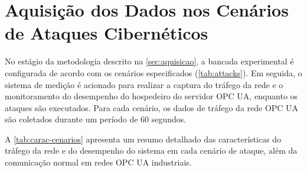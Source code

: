 \section{Aquisição dos Dados nos Cenários de Ataques Cibernéticos} \label{sec:exec-attacks}

    No estágio da metodologia descrito na \autoref{sec:aquisicao}, a bancada experimental é configurada de acordo com os cenários especificados (\autoref{tab:attacks}). Em seguida, o sistema de medição é acionado para realizar a captura do tráfego da rede e o monitoramento do desempenho do hospedeiro do servidor OPC UA, enquanto os ataques são executados. Para cada cenário, os dados de tráfego da rede OPC UA são coletados durante um período de 60 segundos.
    
    A \autoref{tab:carac-cenarios} apresenta um resumo detalhado das características do tráfego da rede e do desempenho do sistema em cada cenário de ataque, além da comunicação normal em redes OPC UA industriais.    


